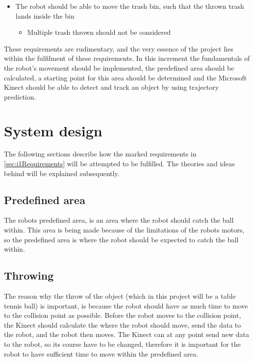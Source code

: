 \begin{itemize}
\begin{itemize}
\end{itemize}
\item The robot should be able to move the trash bin, such that the thrown trash lands inside the bin
\begin{itemize}
\item Multiple trash thrown should not be considered
\end{itemize}
\end{itemize}

These requirements are rudimentary, and the very essence of the project lies within the fulfilment of these requirements. In this increment the fundamentals of the robot’s movement should be implemented, the predefined area should be calculated, a starting point for this area should be determined and the Microsoft Kinect should be able to detect and track an object by using trajectory prediction.

\section{System design}
\label{sec:i1System Design}
The following sections describe how the marked requirements in \ref{sec:i1Requirements} will be attempted to be fulfilled. The theories and ideas behind will be explained subsequently.

\subsection{Predefined area}
\label{sec:i1Predefined area}
The robots predefined area, is an area where the robot should catch the ball within. This area is being made because of the limitations of the robots motors, so the predefined area is where the robot should be expected to catch the ball within.

\subsection{Throwing}
\label{sec:i1Throwing}
The reason why the throw of the object (which in this project will be a table tennis ball) is important, is because the robot should have as much time to move to the collision point as possible. Before the robot moves to the collision point, the Kinect should calculate the where the robot should move, send the data to the robot, and the robot then moves. The Kinect can at any point send new data to the robot, so its course have to be changed, therefore it is important for the robot to have sufficient time to move within the predefined area.    

